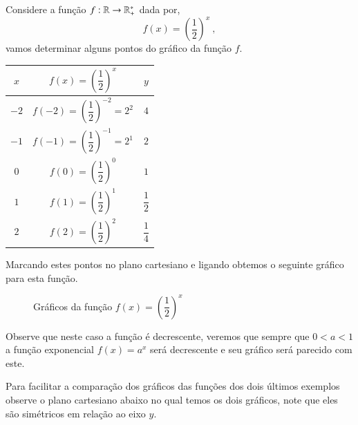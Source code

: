   \begin{exem}\label{ex:exp-1/2}
  Considere a função $f: \mathbb{R} \rightarrow \mathbb{R}_{+}^{*} $ dada por,
  \[f(x) = \left(\dfrac{1}{2}\right)^x \ , \]
  vamos determinar alguns pontos do gráfico da função $f$.

  \begin{table}[H]
  \centering
  \begin{tabular}{|c|c|c|} \hline
  \rowcolor{cinza}
  $x$ & $f(x) = \left(\dfrac{1}{2}\right)^x$ & $y$ \\ \hline
  $-2$ & $f(-2)= \left(\dfrac{1}{2}\right)^{-2}= 2^2$ & $4$ \\ \hline
  $-1$ & $f(-1)= \left(\dfrac{1}{2}\right)^{-1}= 2^1$ & $2$ \\ \hline
  $0$ & $f(0)= \left(\dfrac{1}{2}\right)^{0}$ & $1$ \\ \hline
  $1$ & $f(1)= \left(\dfrac{1}{2}\right)^{1}$ & $\dfrac{1}{2}$ \\ \hline
  $2$ & $f(2)= \left(\dfrac{1}{2}\right)^{2}$ & $\dfrac{1}{4}$ \\ \hline
  \end{tabular}
  \end{table}

  Marcando estes pontos no plano cartesiano e ligando obtemos o seguinte gráfico para esta função.

  \begin{figure}[H]
  \centering
    \caption{Gráficos da função $f(x)=\left(\dfrac{1}{2}\right)^x$}
  \end{figure}

  Observe que neste caso a função é decrescente, veremos que sempre que $0< a < 1$ a função exponencial $f(x)=a^x$ será decrescente e seu gráfico será parecido com este.

 \end{exem}

 Para facilitar a comparação dos gráficos das funções dos dois últimos exemplos observe o plano cartesiano abaixo no qual temos os dois gráficos, note que eles são simétricos em relação ao eixo $y$.

